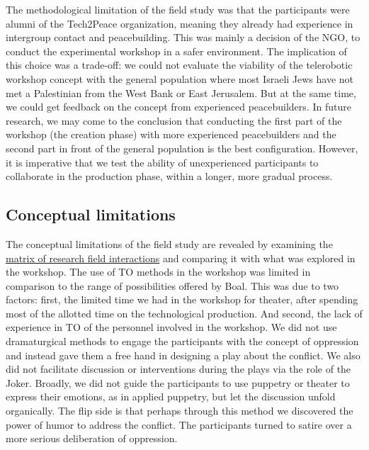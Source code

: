 \documentclass[dissertation,math,vertlayout,pdfa,colorlinks,nologo]{aaltoseries}
\begin{document}
The methodological limitation of the field study was that the participants were alumni of the Tech2Peace organization, meaning they already had experience in intergroup contact and peacebuilding. This was mainly a decision of the NGO, to conduct the experimental workshop in a safer environment. The implication of this choice was a trade-off: we could not evaluate the viability of the telerobotic workshop concept with the general population where most Israeli Jews have not met a Palestinian from the West Bank or East Jerusalem. But at the same time, we could get feedback on the concept from experienced peacebuilders. In future research, we may come to the conclusion that conducting the first part of the workshop (the creation phase) with more experienced peacebuilders and the second part in front of the general population is the best configuration. However, it is imperative that we test the ability of unexperienced participants to collaborate in the production phase, within a longer, more gradual process.

\subsection{Conceptual limitations}
The conceptual limitations of the field study are revealed by examining the \hyperref[sec:matrix_of_intersections]{matrix of research field interactions} and comparing it with what was explored in the workshop. The use of TO methods in the workshop was limited in comparison to the range of possibilities offered by Boal. This was due to two factors: first, the limited time we had in the workshop for theater, after spending most of the allotted time on the technological production. And second, the lack of experience in TO of the personnel involved in the workshop. We did not use dramaturgical methods to engage the participants with the concept of oppression and instead gave them a free hand in designing a play about the conflict. We also did not facilitate discussion or interventions during the plays via the role of the Joker. Broadly, we did not guide the participants to use puppetry or theater to express their emotions, as in applied puppetry, but let the discussion unfold organically. The flip side is that perhaps through this method we discovered the power of humor to address the conflict. The participants turned to satire over a more serious deliberation of oppression. 
\end{document}
